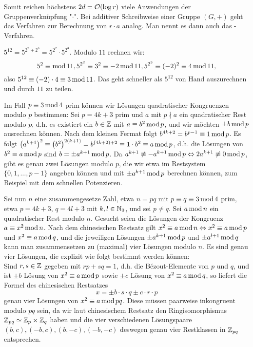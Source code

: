 Somit reichen höchstens $2d = \oh(\log r)$ viele Anwendungen der Gruppenverknüpfung "$\cdot$". Bei additiver Schreibweise einer Gruppe $(G,+)$ geht das Verfahren zur Berechnung von $r \cdot a$ analog. Man nennt es dann auch das -Verfahren.

\begin{bsp}
	$5^{12} = 5^{2^2+2^3} = 5^{2^2} \cdot 5^{2^3}$. Modulo $11$ rechnen wir:
	\[5^2 \kon  \modu 11, 5^{2^2} \kon 3^2 \kon -2 \modu 11, 5^{2^3} \kon (-2)^2 \kon 4 \modu 11, \]
	also $5^{12} \kon (-2) \cdot 4 \kon 3 \modu 11$. Das geht schneller als $5^{12}$ von Hand auszurechnen und durch $11$ zu teilen.
\end{bsp}

\begin{anw}
	Im Fall $p \kon 3 \modu 4$ prim können wir Lösungen quadratischer Kongruenzen modulo $p$ bestimmen: Sei $p = 4k+3$ prim und $a$ mit $p \nmid a$ ein quadratischer Rest modulo $p$, d.h. es existiert ein $b \in \ZZ$ mit $a \kon b^2 \modu p$, und wir möchten $\pm b \modu p$ ausrechnen können. Nach dem kleinen Fermat folgt $b^{4k+2} = b^{p-1} \kon 1 \modu p$. Es folgt $\enbrace*{a^{k+1}}^2 \kon \enbrace*{b^2}^{2(k+1)} = b^{(4k+2)+2} \kon 1 \cdot b^2 \kon a \modu p$, d.h. die Lösungen von $b^2 \kon a \modu p$ sind $b = \pm a^{k+1} \modu p$. Da $a^{k+1} \not\kon -a^{k+1} \modu p \Leftrightarrow 2a^{k+1} \not\kon 0 \modu p$, gibt es genau zwei Lösungen modulo $p$, die wir etwa im Restsystem $\{0,1,\dots,p-1\}$ angeben können und mit $\pm a^{k+1} \modu p$ berechnen können, zum Beispiel mit dem schnellen Potenzieren.
\end{anw}

\begin{anw}
\label{anw_1.1.3.14}
	Sei nun $n$ eine zusammengesetze Zahl, etwa $n = pq$ mit $p \kon q \kon 3 \modu 4$ prim, etwa $p = 4k+3$, $q = 4l+3$ mit $k,l \in \NN_0$, und sei $p \neq q$. Sei $a \modu n$ ein quadratischer Rest modulo $n$. Gesucht seien die Lösungen der Kongruenz $a \kon x^2 \modu n$. Nach dem chinesischen Restsatz gilt $x^2 \kon a \modu n \Leftrightarrow x^2 \kon a \modu p$ und $x^2 \kon a \modu q$, und die jeweiligen Lösungen $\pm a^{k+1} \modu p$ und $\pm a^{l+1} \modu q$ kann man zusammensetzen zu (maximal) vier Lösungen modulo $n$. Es sind genau vier Lösungen, die explizit wie folgt bestimmt werden können: \\
	Sind $r,s \in \ZZ$ gegeben mit $rp + sq = 1$, d.h. die Bézout-Elemente von $p$ und $q$, und ist $\pm b$ Lösung von $x^2 \kon a \modu p$ sowie $\pm c$ Lösung von $x^2 \kon a \modu q$, so liefert die Formel des chinesischen Restsatzes
	\[ x = \pm b\cdot s \cdot q \pm c \cdot r \cdot p \]
	genau vier Lösungen von $x^2 \kon a \modu pq$. Diese müssen paarweise inkongruent modulo $pq$ sein, da wir laut chinesischem Restsatz den Ringisomorphismus $\ZZ_{pq} \simeq \ZZ_p \times \ZZ_q$ haben und die vier verschiedenen Lösungspaare $(b,c), (-b,c), (b,-c), (-b,-c)$ deswegen genau vier Restklassen in $\ZZ_{pq}$ entsprechen.
\end{anw}

